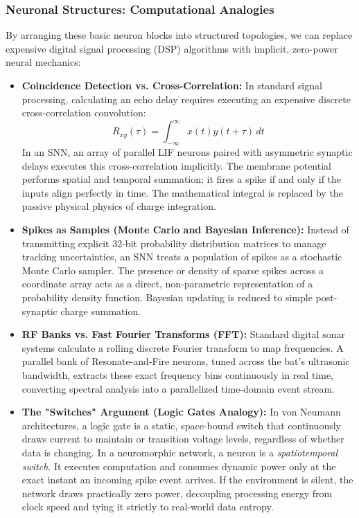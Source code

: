 \subsubsection{Neuronal Structures: Computational Analogies}
By arranging these basic neuron blocks into structured topologies, we can replace expensive digital signal processing (DSP) algorithms with implicit, zero-power neural mechanics:

\begin{itemize}
    \item \textbf{Coincidence Detection vs. Cross-Correlation:} In standard signal processing, calculating an echo delay requires executing an expensive discrete cross-correlation convolution:
    \begin{equation}
        R_{xy}(\tau) = \int_{-\infty}^{\infty} x(t)y(t+\tau) \, dt
    \end{equation}
    In an SNN, an array of parallel LIF neurons paired with asymmetric synaptic delays executes this cross-correlation implicitly. The membrane potential performs spatial and temporal summation; it fires a spike if and only if the inputs align perfectly in time. The mathematical integral is replaced by the passive physical physics of charge integration.
    
    \item \textbf{Spikes as Samples (Monte Carlo and Bayesian Inference):} Instead of transmitting explicit 32-bit probability distribution matrices to manage tracking uncertainties, an SNN treats a population of spikes as a stochastic Monte Carlo sampler. The presence or density of sparse spikes across a coordinate array acts as a direct, non-parametric representation of a probability density function. Bayesian updating is reduced to simple post-synaptic charge summation.
    
    \item \textbf{RF Banks vs. Fast Fourier Transforms (FFT):} Standard digital sonar systems calculate a rolling discrete Fourier transform to map frequencies. A parallel bank of Resonate-and-Fire neurons, tuned across the bat's ultrasonic bandwidth, extracts these exact frequency bins continuously in real time, converting spectral analysis into a parallelized time-domain event stream.
    
    \item \textbf{The "Switches" Argument (Logic Gates Analogy):} In von Neumann architectures, a logic gate is a static, space-bound switch that continuously draws current to maintain or transition voltage levels, regardless of whether data is changing. In a neuromorphic network, a neuron is a \textit{spatiotemporal switch}. It executes computation and consumes dynamic power only at the exact instant an incoming spike event arrives. If the environment is silent, the network draws practically zero power, decoupling processing energy from clock speed and tying it strictly to real-world data entropy.
\end{itemize}

